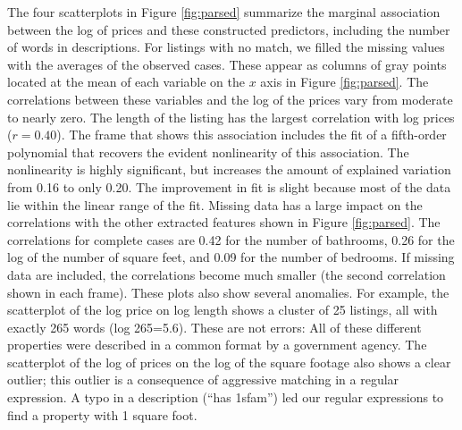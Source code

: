 \documentclass[12pt]{article}
\begin{document}
 The four scatterplots in Figure \ref{fig:parsed} summarize the marginal
 association between the log of prices and these constructed predictors,
 including the number of words in descriptions.  For listings with no match, we
 filled the missing values with the averages of the observed cases.  These
 appear as columns of gray points located at the mean of each variable on the $x$
 axis in Figure \ref{fig:parsed}.  The correlations between these variables and
 the log of the prices vary from moderate to nearly zero.  The length of the
 listing has the largest correlation with log prices ($r=0.40$). The frame that shows this association includes the fit of
 a fifth-order polynomial that recovers the evident nonlinearity of this
 association.  The nonlinearity is highly significant, but increases the amount
 of explained variation from 0.16 to only 0.20.  The improvement in fit is
 slight because most of the data lie within the linear range of the fit.
  Missing data has a large impact on the correlations with the other extracted
 features shown in Figure \ref{fig:parsed}.  The correlations for complete cases
 are 0.42 for the number of bathrooms, 0.26 for the log of the number of square
 feet, and 0.09 for the number of bedrooms.  If missing data are included, the
 correlations become much smaller (the second correlation shown in each frame).
  These plots also show several anomalies.  For example, the scatterplot of the
 log price on log length shows a cluster of 25 listings, all with exactly 265
 words (log 265=5.6).  These are not errors: All of these different properties
 were described in a common format by a government agency.  The scatterplot of
 the log of prices on the log of the square footage also shows a clear outlier;
 this outlier is a consequence of aggressive matching in a regular expression.
  A typo in a description (``has 1sfam'') led our regular expressions to find a
 property with 1 square foot.
\end{document}
